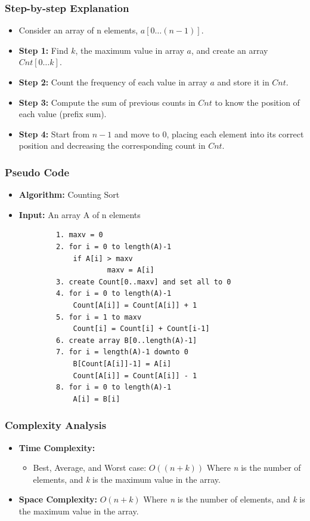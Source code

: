     \subsubsection{Step-by-step Explanation}
        \begin{itemize}
            \item Consider an array of n elements, $a[0 \ldots (n-1)]$.
            \item \textbf{Step 1:} Find $k$, the maximum value in array $a$, and create an array $Cnt[0 \ldots k]$.
            \item \textbf{Step 2:} Count the frequency of each value in array $a$ and store it in $Cnt$.
            \item \textbf{Step 3:} Compute the sum of previous counts in $Cnt$ to know the position of each value (prefix sum).
            \item \textbf{Step 4:} Start from $n-1$ and move to $0$, placing each element into its correct position and decreasing the corresponding count in $Cnt$.        \end{itemize}
    \subsubsection{Pseudo Code}
        \begin{itemize}
            \item \textbf{Algorithm:} Counting Sort
            \item \textbf{Input:} An array A of n elements
        \end{itemize}
        \begin{verbatim}
            1. maxv = 0
            2. for i = 0 to length(A)-1
                if A[i] > maxv
                        maxv = A[i]
            3. create Count[0..maxv] and set all to 0
            4. for i = 0 to length(A)-1
                Count[A[i]] = Count[A[i]] + 1
            5. for i = 1 to maxv
                Count[i] = Count[i] + Count[i-1]
            6. create array B[0..length(A)-1]
            7. for i = length(A)-1 downto 0
                B[Count[A[i]]-1] = A[i]
                Count[A[i]] = Count[A[i]] - 1
            8. for i = 0 to length(A)-1
                A[i] = B[i]
        \end{verbatim}
    \subsubsection{Complexity Analysis}
        \begin{itemize}
            \item \textbf{Time Complexity:}
            \begin{itemize}
                \item Best, Average, and Worst case: $O((n + k))$
                    \subitem Where \textit{n} is the number of elements, and \textit{k} is the maximum value in the array.
            \end{itemize}
            \item \textbf{Space Complexity:} $O(n + k)$ 
                \subitem Where \textit{n} is the number of elements, and \textit{k} is the maximum value in the array.
        \end{itemize}
        
